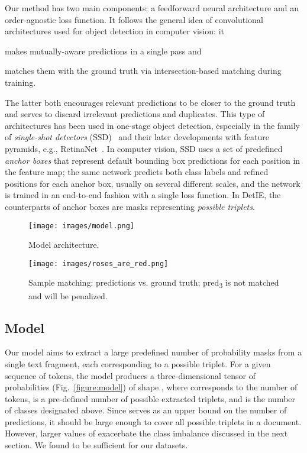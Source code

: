 \documentclass[letterpaper]{article} \usepackage{aaai22}  \usepackage{times}  \usepackage{helvet}  \usepackage{courier}  \usepackage[hyphens]{url}  \usepackage{graphicx} \usepackage{placeins}
\begin{document}
Our method has two main components: a feedforward neural architecture and an order-agnostic loss function. It follows the general idea of convolutional architectures used for object detection in computer vision: it
\begin{inparaenum}[(1)]
    \item makes mutually-aware predictions in a single pass and
    \item matches them with the ground truth via intersection-based matching during training.
\end{inparaenum}
The latter both encourages relevant predictions to be closer to the ground truth and serves to discard irrelevant predictions and duplicates.
This type of architectures has been used in one-stage object detection, especially in the family of \emph{single-shot detectors} (SSD)~\cite{SSD} and their later developments with feature pyramids, e.g., RetinaNet~\cite{lin2017focal}. In computer vision, SSD uses a set of predefined \emph{anchor boxes} that represent default bounding box predictions for each position in the feature map; the same network predicts both class labels and refined positions for each anchor box, usually on several different scales, and the network is trained in an end-to-end fashion with a single loss function. In DetIE, the counterparts of anchor boxes are masks representing \emph{possible triplets}.

\begin{figure}[!t]\centering
\texttt{[image: images/model.png]}
\caption{Model architecture.}\label{figure:model}

\texttt{[image: images/roses\_are\_red.png]}
\caption{Sample matching: predictions vs. ground truth; pred\textsubscript{3} is not matched and will be penalized. 
}\label{fig:bipartite}
\end{figure}

\subsection{Model}
Our model aims to extract a large predefined number of probability masks from a single text fragment, each corresponding to a possible triplet. For a given sequence of tokens, the model produces a three-dimensional tensor of probabilities  (Fig.~\ref{figure:model}) of shape , where  corresponds to the number of tokens,  is a pre-defined number of possible extracted triplets, and  is the number of classes designated above. Since  serves as an upper bound on the number of predictions, it should be large enough to cover all possible triplets in a document. However, larger values of  exacerbate the class imbalance discussed in the next section. We found  to be sufficient for our datasets.
\end{document}
